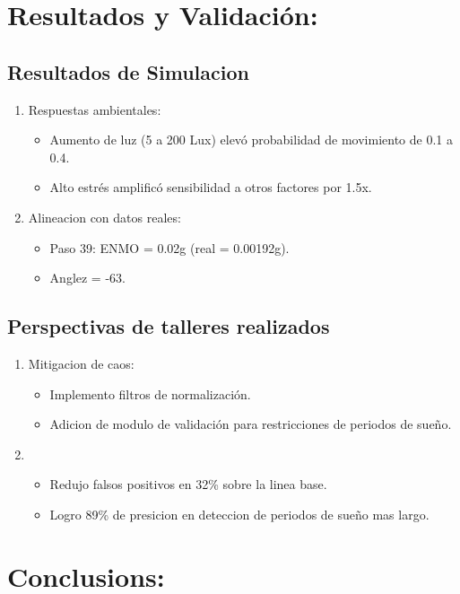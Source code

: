 \documentclass[conference]{IEEEtran}
\begin{document}
\section{Resultados y Validación: }
\subsection{Resultados de Simulacion}
\begin{enumerate}
    \item Respuestas ambientales:
        \begin{itemize}
        \item Aumento de luz (5 a 200 Lux) elevó probabilidad de movimiento de 0.1 a 0.4.
        \item Alto estrés amplificó sensibilidad a otros factores por 1.5x.
        \end{itemize}
    \item Alineacion con datos reales:
        \begin{itemize}
        \item Paso 39: ENMO = 0.02g (real = 0.00192g).
        \item Anglez = -63.
        \end{itemize}
\end{enumerate}
\subsection{Perspectivas de talleres realizados}
\begin{enumerate}
    \item Mitigacion de caos:
        \begin{itemize}
        \item Implemento filtros de normalización.
        \item Adicion de modulo de validación para restricciones de periodos de sueño.
        \end{itemize}
    \item
        \begin{itemize}
        \item Redujo falsos positivos en 32\% sobre la linea base.
        \item Logro 89\% de presicion en deteccion de periodos de sueño mas largo.
        \end{itemize}
\end{enumerate}

\section{Conclusions: }
\end{document}
